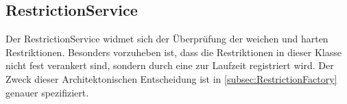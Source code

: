 \subsection{RestrictionService}\label{subsec:RestrictionService}
Der RestrictionService widmet sich der Überprüfung der weichen und harten Restriktionen.
Besonders vorzuheben ist, dass die Restriktionen in dieser Klasse nicht fest verankert sind,
sondern durch eine  zur Laufzeit registriert wird.
Der Zweck dieser Architektonischen Entscheidung ist in \ref{subsec:RestrictionFactory} genauer spezifiziert.
